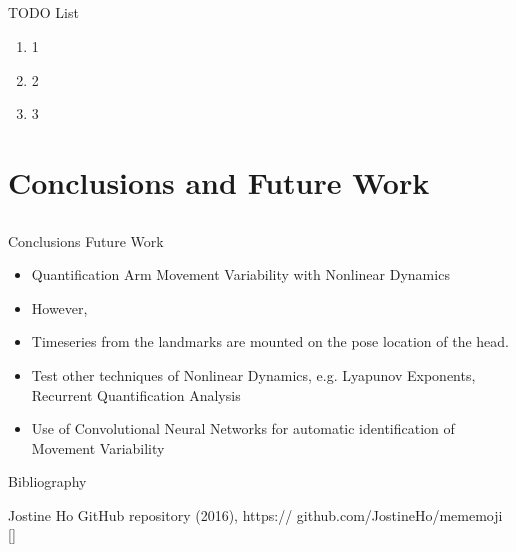 \documentclass[compress]{beamer}
\begin{document}
\subsection{}
{
\begin{frame}{TODO List}


          \begin{enumerate}
              \item 1
              \item 2 
              \item 3 
          \end{enumerate}

\end{frame}
}


\section{Conclusions and Future Work}

\subsection{}
{
\begin{frame}{Conclusions Future Work}

\begin{itemize}
	\item Quantification Arm Movement Variability with Nonlinear Dynamics
        \item However,
        \item Timeseries from the landmarks are mounted on the pose location of the head. 
\end{itemize}

\begin{itemize}
	\item Test other techniques of Nonlinear Dynamics, e.g. Lyapunov Exponents, Recurrent Quantification Analysis
	\item Use of Convolutional Neural Networks for automatic identification of Movement Variability
\end{itemize}



\end{frame}
}






\begin{frame}{Bibliography}
    \begin{thebibliography}{10}

\beamertemplatearticlebibitems
      Jostine Ho       
      \newblock {}
      \newblock GitHub repository (2016), https:// github.com/JostineHo/mememoji [\href{https:// github.com/JostineHo/mememoji}{\faGithub}]


    \end{thebibliography}
\end{frame}




\closingtitle


\end{document}

